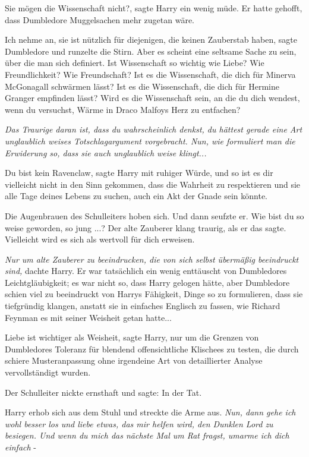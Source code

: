 \glqq{}Sie mögen die Wissenschaft nicht?\grqq{}, sagte Harry ein wenig müde. Er
hatte gehofft, dass Dumbledore Muggelsachen mehr zugetan wäre.

\glqq{}Ich nehme an, sie ist nützlich für diejenigen, die keinen Zauberstab
haben\grqq{}, sagte Dumbledore und runzelte die Stirn. \glqq{}Aber es scheint
eine seltsame Sache zu sein, über die man sich definiert. Ist Wissenschaft so
wichtig wie Liebe? Wie Freundlichkeit? Wie Freundschaft? Ist es die
Wissenschaft, die dich für Minerva McGonagall schwärmen lässt? Ist es die
Wissenschaft, die dich für Hermine Granger empfinden lässt? Wird es die
Wissenschaft sein, an die du dich wendest, wenn du versuchst, Wärme in Draco
Malfoys Herz zu entfachen?\grqq{}

\emph{Das Traurige daran ist, dass du wahrscheinlich denkst, du hättest gerade
eine Art unglaublich weises Totschlagargument vorgebracht. Nun, wie formuliert
man die Erwiderung so, dass sie auch unglaublich weise klingt...}

\glqq{}Du bist kein Ravenclaw\grqq{}, sagte Harry mit ruhiger Würde, \glqq{}und so
ist es dir vielleicht nicht in den Sinn gekommen, dass die Wahrheit zu
respektieren und sie alle Tage deines Lebens zu suchen, auch ein Akt der Gnade
sein könnte.\grqq{}

Die Augenbrauen des Schulleiters hoben sich. Und dann seufzte er. \glqq{}Wie bist
du so weise geworden, so jung ...?\grqq{} Der alte Zauberer klang traurig, als
er das sagte. \glqq{}Vielleicht wird es sich als wertvoll für dich
erweisen.\grqq{}

\emph{Nur um alte Zauberer zu beeindrucken, die von sich selbst übermäßig
beeindruckt sind,} dachte Harry. Er war tatsächlich ein wenig enttäuscht von
Dumbledores Leichtgläubigkeit; es war nicht so, dass Harry gelogen hätte, aber
Dumbledore schien viel zu beeindruckt von Harrys Fähigkeit, Dinge so zu
formulieren, dass sie tiefgründig klangen, anstatt sie in einfaches Englisch zu
fassen, wie Richard Feynman es mit seiner Weisheit getan hatte...

\glqq{}Liebe ist wichtiger als Weisheit\grqq{}, sagte Harry, nur um die Grenzen
von Dumbledores Toleranz für blendend offensichtliche Klischees zu testen, die
durch schiere Musteranpassung ohne irgendeine Art von detaillierter Analyse
vervollständigt wurden.

Der Schulleiter nickte ernsthaft und sagte: \glqq{}In der Tat.\grqq{}

Harry erhob sich aus dem Stuhl und streckte die Arme aus. \emph{Nun, dann gehe
ich wohl besser los und liebe etwas, das mir helfen wird, den Dunklen Lord zu
besiegen. Und wenn du mich das nächste Mal um Rat fragst, umarme ich dich
einfach} -

